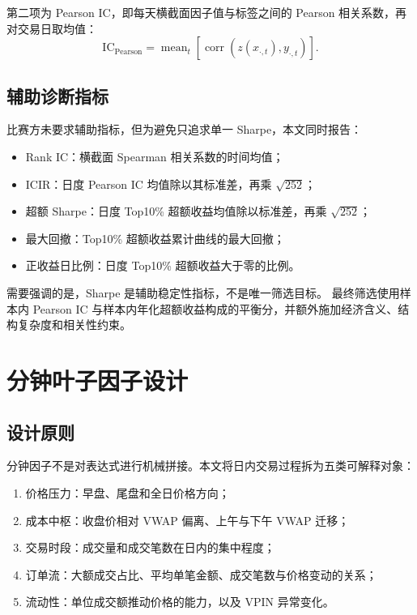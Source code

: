 \documentclass[UTF8,11pt,a4paper]{ctexart}
\begin{document}
第二项为 Pearson IC，即每天横截面因子值与标签之间的 Pearson 相关系数，再对交易日取均值：
\begin{equation}
\mathrm{IC}_{\mathrm{Pearson}} =
\operatorname{mean}_t\left[\operatorname{corr}\left(z(x_{\cdot,t}),y_{\cdot,t}\right)\right].
\end{equation}

\subsection{辅助诊断指标}

比赛方未要求辅助指标，但为避免只追求单一 Sharpe，本文同时报告：
\begin{itemize}[leftmargin=2em]
  \item Rank IC：横截面 Spearman 相关系数的时间均值；
  \item ICIR：日度 Pearson IC 均值除以其标准差，再乘 $\sqrt{252}$；
  \item 超额 Sharpe：日度 Top10\% 超额收益均值除以标准差，再乘 $\sqrt{252}$；
  \item 最大回撤：Top10\% 超额收益累计曲线的最大回撤；
  \item 正收益日比例：日度 Top10\% 超额收益大于零的比例。
\end{itemize}

需要强调的是，Sharpe 是辅助稳定性指标，不是唯一筛选目标。
最终筛选使用样本内 Pearson IC 与样本内年化超额收益构成的平衡分，并额外施加经济含义、结构复杂度和相关性约束。

\section{分钟叶子因子设计}

\subsection{设计原则}

分钟因子不是对表达式进行机械拼接。本文将日内交易过程拆为五类可解释对象：
\begin{enumerate}[leftmargin=2em]
  \item 价格压力：早盘、尾盘和全日价格方向；
  \item 成本中枢：收盘价相对 VWAP 偏离、上午与下午 VWAP 迁移；
  \item 交易时段：成交量和成交笔数在日内的集中程度；
  \item 订单流：大额成交占比、平均单笔金额、成交笔数与价格变动的关系；
  \item 流动性：单位成交额推动价格的能力，以及 VPIN 异常变化。
\end{enumerate}
\end{document}
